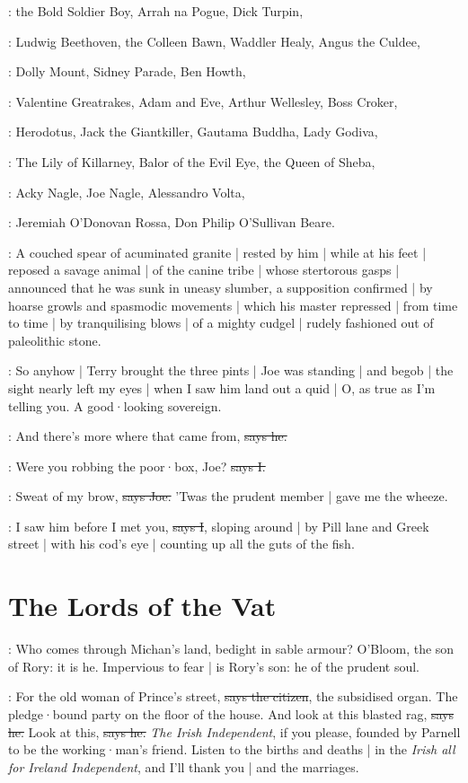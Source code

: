 :
the Bold Soldier Boy,
Arrah na Pogue,
Dick Turpin,

:
Ludwig Beethoven,
the Colleen Bawn,
Waddler Healy,
Angus the Culdee,

:
Dolly Mount,
Sidney Parade,
Ben Howth,

:
Valentine Greatrakes,
Adam and Eve,
Arthur Wellesley,
Boss Croker,

:
Herodotus,
Jack the Giantkiller,
Gautama Buddha,
Lady Godiva,

:
The Lily of Killarney,
Balor of the Evil Eye,
the Queen of Sheba,

:
Acky Nagle,
Joe Nagle,
Alessandro Volta,

:
Jeremiah O'Donovan Rossa,
Don Philip O'Sullivan Beare.

:
A couched spear of acuminated granite |
rested by him
 |
while at his feet |
reposed a savage animal |
of the canine tribe |
whose stertorous gasps |
announced that he was sunk in uneasy slumber,
a supposition confirmed |
by hoarse growls and spasmodic movements |
which his master repressed |
from time to time |
by tranquilising blows |
of a mighty cudgel |
rudely fashioned out of paleolithic stone.

\Nq:
So anyhow |
Terry brought the three pints |
Joe was standing |
and begob |
the sight nearly left my eyes |
when I saw him land out a quid |
O,
as true as I'm telling you.
A good·looking sovereign.

\joe:
And there's more where that came from,
\sout{says he.}

:
Were you robbing the poor·box,
Joe?
\sout{says I.}

\joe:
Sweat of my brow,
\sout{says Joe.}
'Twas the prudent member |
gave me the wheeze.

:
I saw him before I met you,
\sout{says I},
sloping around |
by Pill lane and Greek street |
with his cod's eye |
counting up all the guts of the fish.


\section{The Lords of the Vat}

:
Who comes through Michan's land,
bedight in sable armour?
O'Bloom,
the son of Rory:
it is he.
Impervious to fear |
is Rory's son:
he of the prudent soul.

\citizen:
For the old woman of Prince's street,
\sout{says the citizen},
the subsidised organ.
The pledge·bound party on the floor of the house.
And look at this blasted rag,
\sout{says he.}
%
Look at this,
\sout{says he.}
\emph{The Irish Independent},
if you please,
founded by Parnell to be the working·man's friend.
Listen to the births and deaths |
in the \emph{Irish all for Ireland Independent},
and I'll thank you |
and the marriages.

